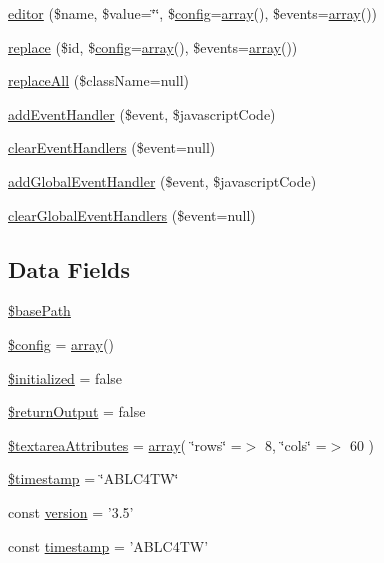 \begin{DoxyCompactItemize}
\hyperlink{classCKEditor_a7379361d078919956eb2ce371f0e85d9}{editor} (\$name, \$value=\char`\"{}\char`\"{}, \$\hyperlink{events_8php_a3f176ffce3afa63656bfc989470e3e24}{config}=\hyperlink{list_8php_aa3205d038c7f8feb5c9f01ac4dfadc88}{array}(), \$events=\hyperlink{list_8php_aa3205d038c7f8feb5c9f01ac4dfadc88}{array}())
\item 
\hyperlink{classCKEditor_ac798a39de3a7a9e96295b34dd497d73c}{replace} (\$id, \$\hyperlink{events_8php_a3f176ffce3afa63656bfc989470e3e24}{config}=\hyperlink{list_8php_aa3205d038c7f8feb5c9f01ac4dfadc88}{array}(), \$events=\hyperlink{list_8php_aa3205d038c7f8feb5c9f01ac4dfadc88}{array}())
\item 
\hyperlink{classCKEditor_ae4962c323d713734f27740845a315c68}{replaceAll} (\$className=null)
\item 
\hyperlink{classCKEditor_a016cd23cfdcf8e5dff8555129776f80d}{addEventHandler} (\$event, \$javascriptCode)
\item 
\hyperlink{classCKEditor_a711b8195ab3ccc474b2a13a2d6639787}{clearEventHandlers} (\$event=null)
\item 
\hyperlink{classCKEditor_af31450c711eefdf7b446e53feae93b98}{addGlobalEventHandler} (\$event, \$javascriptCode)
\item 
\hyperlink{classCKEditor_ad67af605e90bb21364347dffab4b6c08}{clearGlobalEventHandlers} (\$event=null)
\end{DoxyCompactItemize}
\subsection*{Data Fields}
\begin{DoxyCompactItemize}
\item 
\hyperlink{classCKEditor_a9cd745428004768fe921475a29a7d870}{\$basePath}
\item 
\hyperlink{classCKEditor_a49c7011be9c979d9174c52a8b83e5d8e}{\$config} = \hyperlink{list_8php_aa3205d038c7f8feb5c9f01ac4dfadc88}{array}()
\item 
\hyperlink{classCKEditor_a533c66c9995bd9f022b5f5b325c12ad4}{\$initialized} = false
\item 
\hyperlink{classCKEditor_a5970de8e632edcc5a145c18382ad5f86}{\$returnOutput} = false
\item 
\hyperlink{classCKEditor_a98562b08f6a3c136e6478d9f563fb2ea}{\$textareaAttributes} = \hyperlink{list_8php_aa3205d038c7f8feb5c9f01ac4dfadc88}{array}( \char`\"{}rows\char`\"{} =$>$ 8, \char`\"{}cols\char`\"{} =$>$ 60 )
\item 
\hyperlink{classCKEditor_a2b69de9676dd97c675cd4d9bcceb684c}{\$timestamp} = \char`\"{}ABLC4TW\char`\"{}
\item 
const \hyperlink{classCKEditor_a265a39dcf2f0b7c6b96574362aa01ad9}{version} = '3.5'
\item 
const \hyperlink{classCKEditor_a60f5680e2f56092a5803e2e95315eb88}{timestamp} = 'ABLC4TW'
\end{DoxyCompactItemize}


